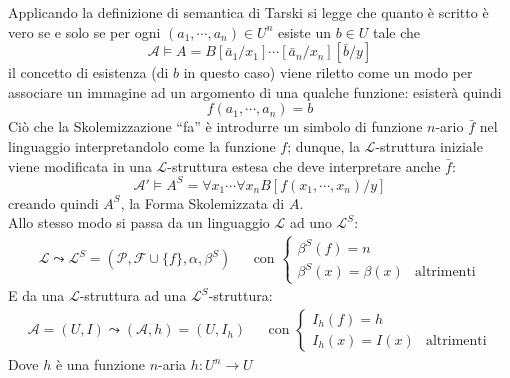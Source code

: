 Applicando la definizione di semantica di Tarski si legge che quanto è 
scritto è vero se e solo se per ogni $(a_1, \cdots, a_n) \in U^n$ esiste 
un $b \in U$ tale che 
$$
\mathscr{A} \models A = B[\bar{a}_1/x_1]\cdots[\bar{a}_n/x_n][\bar{b}/y]
$$
il concetto di esistenza (di $b$ in questo caso) viene riletto come un modo 
per associare un immagine ad un argomento di una qualche funzione: esisterà quindi
$$
f(a_1, \cdots, a_n) = b
$$
Ciò che la Skolemizzazione ``fa'' è introdurre un simbolo di funzione $n$-ario $\bar f$ nel linguaggio interpretandolo come la funzione $f$; dunque, la $\mathscr{L}$-struttura iniziale viene modificata in una $\mathscr{L}$-struttura estesa che deve interpretare anche $\bar f$:
$$
\mathscr{A}' \models A^S = \forall x_1 \cdots \forall x_n B[f(x_1, \cdots, x_n)/y]
$$
creando quindi $A^S$, la Forma Skolemizzata di $A$. \\
Allo stesso modo si passa da un linguaggio $\mathscr{L}$ ad uno $\mathscr{L}^S$:
\begin{align*}
  \mathscr{L} \leadsto \mathscr{L}^S = (\mathscr{P}, \mathscr{F } \cup \{f\}, \alpha, \beta^S) &&
  \text{con }
  \begin{cases}
    \beta^S(f) = n \\
    \beta^S(x) = \beta(x) & \text{altrimenti}
  \end{cases}
\end{align*} 
E da una $\mathscr{L}$-struttura ad una $\mathscr{L}^S$-struttura:
\begin{align*}
  \mathscr{A} = (U,I) \leadsto (\mathscr{A}, h) = (U, I_h) &&
  \text{con }
  \begin{cases}
    I_h(f) = h \\
    I_h(x) = I(x) & \text{altrimenti}
  \end{cases}
\end{align*}
Dove $h$ è una funzione $n$-aria $h: U^n \rightarrow U$

